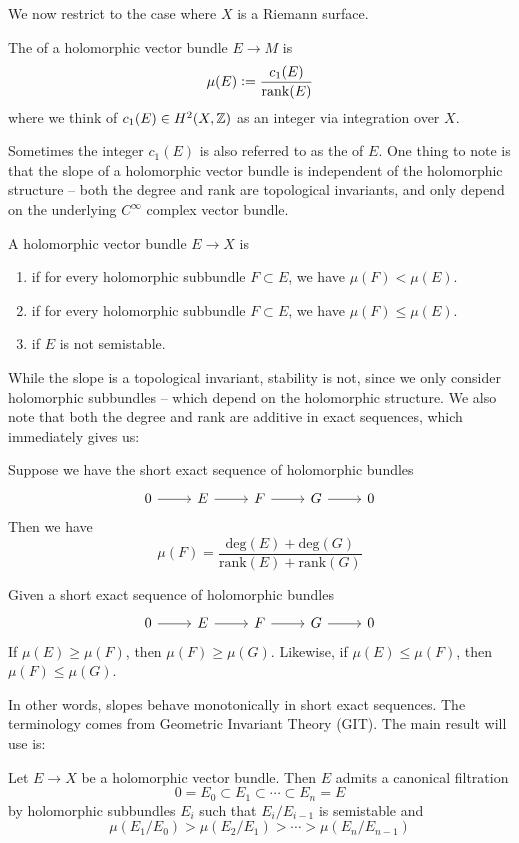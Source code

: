 We now restrict to the case where $X$ is a Riemann surface.
%
\begin{defn}
The  of a holomorphic vector bundle $E \to M$ is
\[
\mu(E) \vcentcolon= \frac{c_1(E)}{\mathrm{rank}(E)}
\]
where we think of $c_1(E) \in H^2(X,\mathbb{Z})$ as an integer via integration over $X$.
\end{defn}
%
Sometimes the integer $c_1(E)$ is also referred to as the  of $E$.
One thing to note is that the slope of a holomorphic vector bundle is
independent of the holomorphic structure -- both the degree and rank are
topological invariants, and only depend on the underlying $C^\infty$ complex
vector bundle.
%
\begin{defn}
A holomorphic vector bundle $E \to X$ is
\begin{enumerate}
  \item {} if for every holomorphic subbundle $F \subset E$,
  we have $\mu(F) < \mu(E)$.
  \item {} if for every holomorphic subbundle $F \subset E$,
  we have $\mu(F) \leq \mu(E)$.
  \item {} if $E$ is not semistable.
\end{enumerate}
\end{defn}
%
While the slope is a topological invariant, stability is not, since
we only consider holomorphic subbundles -- which depend on the holomorphic structure.
We also note that both the degree and rank are additive in exact sequences, which
immediately gives us:
%
\begin{prop}
Suppose we have the short exact sequence of holomorphic bundles
\[\begin{tikzcd}
0 \ar[r] & E \ar[r] & F \ar[r] & G \ar[r] & 0
\end{tikzcd}\]
Then we have
\[
\mu(F) = \frac{\mathrm{deg}(E) + \mathrm{deg}(G)}{\mathrm{rank}(E) + \mathrm{rank}(G)}
\]
\end{prop}
%
\begin{cor}
Given a short exact sequence of holomorphic bundles
\[\begin{tikzcd}
0 \ar[r] & E \ar[r] & F \ar[r] & G \ar[r] & 0
\end{tikzcd}\]
If $\mu(E) \geq \mu(F)$, then $\mu(F) \geq \mu(G)$. Likewise, if $\mu(E) \leq \mu(F)$,
then $\mu(F) \leq \mu(G)$.
\end{cor}
%
In other words, slopes behave monotonically in short exact sequences.
The terminology comes from Geometric Invariant Theory (GIT). The main
result will use is:
%
\begin{thm}
Let $E \to X$ be a holomorphic vector bundle. Then $E$ admits a canonical filtration
\[
0 = E_0 \subset E_1 \subset \cdots \subset E_n = E
\]
by holomorphic subbundles $E_i$ such that $E_i/E_{i-1}$ is semistable and
\[
\mu(E_1/E_0) > \mu(E_2/E_1) > \cdots > \mu(E_n/E_{n-1})
\]
\end{thm}
